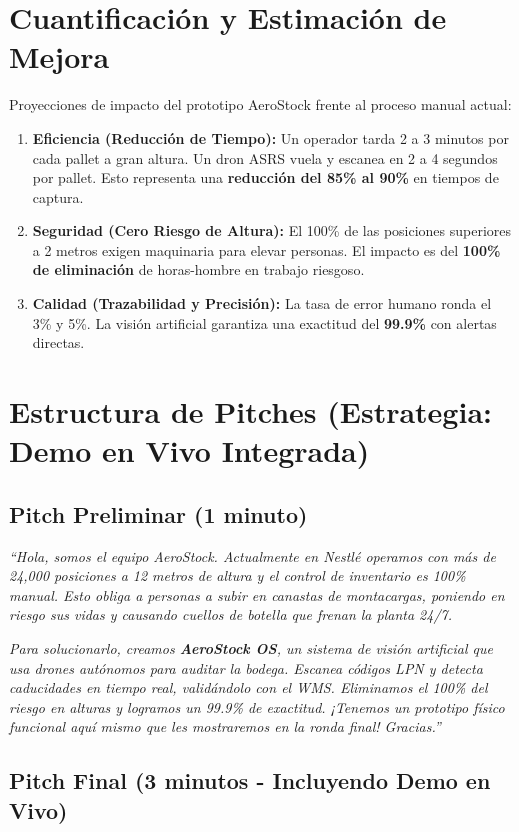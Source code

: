 \documentclass[12pt, a4paper]{article}
\begin{document}
\section{Cuantificación y Estimación de Mejora}

Proyecciones de impacto del prototipo AeroStock frente al proceso manual actual:

\begin{enumerate}
    \item \textbf{Eficiencia (Reducción de Tiempo):} Un operador tarda 2 a 3 minutos por cada pallet a gran altura. Un dron ASRS vuela y escanea en 2 a 4 segundos por pallet. Esto representa una \textbf{reducción del 85\% al 90\%} en tiempos de captura.
    \item \textbf{Seguridad (Cero Riesgo de Altura):} El 100\% de las posiciones superiores a 2 metros exigen maquinaria para elevar personas. El impacto es del \textbf{100\% de eliminación} de horas-hombre en trabajo riesgoso.
    \item \textbf{Calidad (Trazabilidad y Precisión):} La tasa de error humano ronda el 3\% y 5\%. La visión artificial garantiza una exactitud del \textbf{99.9\%} con alertas directas.
\end{enumerate}

\section{Estructura de Pitches (Estrategia: Demo en Vivo Integrada)}

\subsection*{Pitch Preliminar (1 minuto)}
\textit{``Hola, somos el equipo AeroStock. Actualmente en Nestlé operamos con más de 24,000 posiciones a 12 metros de altura y el control de inventario es 100\% manual. Esto obliga a personas a subir en canastas de montacargas, poniendo en riesgo sus vidas y causando cuellos de botella que frenan la planta 24/7.}

\textit{Para solucionarlo, creamos \textbf{AeroStock OS}, un sistema de visión artificial que usa drones autónomos para auditar la bodega. Escanea códigos LPN y detecta caducidades en tiempo real, validándolo con el WMS. Eliminamos el 100\% del riesgo en alturas y logramos un 99.9\% de exactitud. ¡Tenemos un prototipo físico funcional aquí mismo que les mostraremos en la ronda final! Gracias.''}

\subsection*{Pitch Final (3 minutos - Incluyendo Demo en Vivo)}
\end{document}
